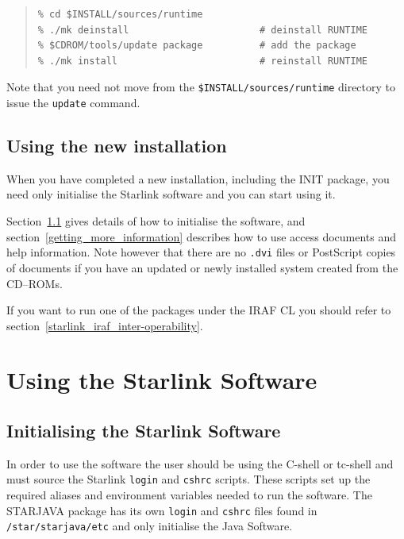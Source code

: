 \documentclass[twoside,11pt]{article}
\newcommand{\xlabel}[1]{}
\renewcommand{\_}{\texttt{\symbol{95}}}
\newcommand{\cdroms}{CD--ROMs}
\newcommand{\cdroms}{CD-ROMs}
\begin{document}
\begin{quote}
\begin{verbatim}
% cd $INSTALL/sources/runtime
% ./mk deinstall                       # deinstall RUNTIME
% $CDROM/tools/update package          # add the package
% ./mk install                         # reinstall RUNTIME
\end{verbatim}
\end{quote}

Note that you need not move from the \texttt{\$INSTALL/sources/runtime}
directory to issue the \texttt{update} command.

\subsection{\xlabel{using_the_new_installation}Using the new installation}
\label{using_the_new_installtion}

When you have completed a new installation, including the INIT package,
you need only initialise the Starlink software and you can start using it.

Section~\ref{initialise_starlink_software} gives details of how to
initialise the software, and section~\ref{getting_more_information}
describes how to use access documents and help information.  Note
however that there are no \texttt{.dvi} files or PostScript copies of
documents if you have an updated or newly installed system created from
the \cdroms.

If you want to run one of the packages under the IRAF CL you should
refer to section~\ref{starlink_iraf_inter-operability}.

\newpage
\section{\xlabel{using_the_starlink_software}{Using the Starlink Software}}
\label{using_the_starlink_software}

\subsection{\xlabel{initialise_starlink_software}Initialising the Starlink Software}
\label{initialise_starlink_software}

In order to use the software the user should be using the C-shell or
tc-shell and must source the Starlink \texttt{login} and \texttt{cshrc}
scripts.  These scripts set up the required aliases and environment
variables needed to run the software. The STARJAVA package has its own
\texttt{login} and \texttt{cshrc} files found in \texttt{/star/starjava/etc}
and only initialise the Java Software.
\end{document}
